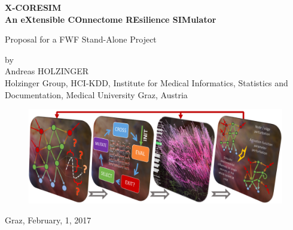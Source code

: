 \documentclass[a4paper,11pt]{article}
\begin{document}
\begin{titlepage}
\begin{center}
\bfseries\Large
X-CORESIM\\ 
An eXtensible COnnectome REsilience SIMulator
\\[0,6cm]
\normalfont\normalsize

Proposal for a FWF Stand-Alone Project

by\\
Andreas HOLZINGER\\

Holzinger Group, HCI-KDD, Institute for Medical Informatics, Statistics and Documentation,
Medical University Graz, Austria
\\[0,4cm]
\begin{figure}[ht]
	\includegraphics[width=\textwidth]{images/Pipeline}
\end{figure}
%
Graz, February, 1, 2017

\end{center}
\vspace{0.5\baselineskip}
\end{titlepage}
\end{document}
